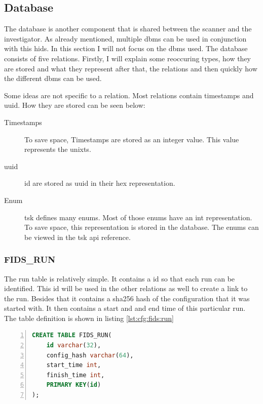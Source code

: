 \subsection{Database}
\label{sec:Database}

The database is another component that is shared between the scanner and the investigator. As already mentioned, multiple \gls{dbms} can be used in conjunction with this \gls{hids}. In this section I will not focus on the \gls{dbms} used. The database consists of five relations. Firstly, I will explain some reoccuring types, how they are stored and what they represent after that, the relations and then quickly how the different \gls{dbms} can be used. 

Some ideas are not specific to a relation. Most relations contain timestamps and \gls{uuid}. How they are stored can be seen below:

\begin{description}
	\item [Timestamps] To save space, Timestamps are stored as an integer value. This value represents the \gls{unixts}. 
	\item [\gls{uuid}] \gls{id} are stored as \gls{uuid} in their \gls{hex} representation. 
	\item [Enum] \gls{tsk} defines many enums. Most of those enums have an int representation. To save space, this representation is stored in the database. The enums can be viewed in the \gls{tsk} \gls{api} reference. \cite{tsk:file:header}
\end{description}

\subsubsection{FIDS\_RUN}

The run table is relatively simple. It contains a \gls{id} so that each run can be identified. This \gls{id} will be used in the other relations as well to create a link to the run. Besides that it contains a \gls{sha256} hash of the configuration that it was started with. It then contains a start and and end time of this particular run. The table definition is shown in listing \ref{lst:cfg:fids:run}

\begin{lstlisting}[language=sql, numbers=left, caption=Fids Run Table Definition, label=lst:cfg:fids:run]
CREATE TABLE FIDS_RUN(
	id varchar(32), 
	config_hash varchar(64), 
	start_time int, 
	finish_time int, 
	PRIMARY KEY(id)
);
\end{lstlisting}



